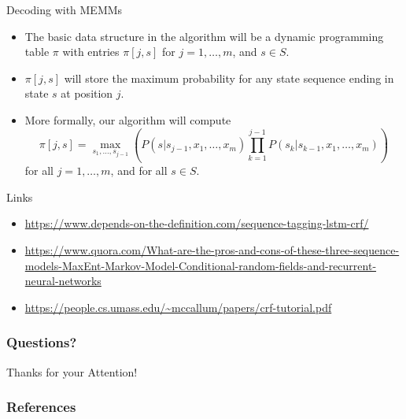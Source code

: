 \documentclass[handout]{beamer}
\begin{document}
\begin{frame}{Decoding with MEMMs}
\begin{scriptsize}
\begin{itemize}

\item The basic data structure in the algorithm will be a dynamic programming table $\pi$ with entries $\pi[j,s]$ for $j=1, \dots, m$, and $s \in S$.

\item  $\pi[j,s]$ will store the maximum probability for any state sequence ending in state $s$ at position $j$.

\item More formally, our algorithm will compute 
\begin{displaymath}
\pi[j,s] =  \operatorname{max}_{s_1,\dots, s_{j-1}}\left(P(s | s_{j-1}, x_1, \dots, x_m) \prod_{k=1}^{j-1}    P(s_k | s_{k-1}, x_1, \dots, x_m)\right)
\end{displaymath}
for all $j = 1, \dots,m$, and for all $s \in S$.

\end{itemize}


\end{scriptsize}
\end{frame}



\begin{frame}{Links}
\begin{scriptsize}
\begin{itemize}

\item \url{https://www.depends-on-the-definition.com/sequence-tagging-lstm-crf/}

\item \url{https://www.quora.com/What-are-the-pros-and-cons-of-these-three-sequence-models-MaxEnt-Markov-Model-Conditional-random-fields-and-recurrent-neural-networks}

\item \url{https://people.cs.umass.edu/~mccallum/papers/crf-tutorial.pdf}

\end{itemize}


\end{scriptsize}
\end{frame}






\begin{frame}
\frametitle{Questions?}
\begin{center}\LARGE Thanks for your Attention!\\ \end{center}



\end{frame}

\begin{frame}[allowframebreaks]\scriptsize
\frametitle{References}


%
\end{frame}  


\end{document}
